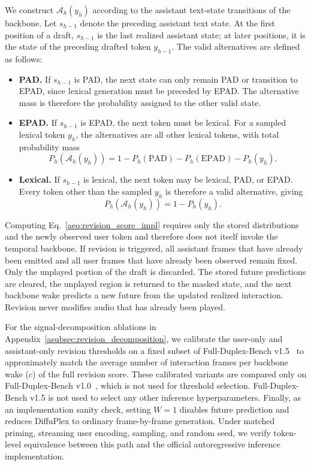 We construct $\mathcal{A}_h(y_h)$ according to the assistant text-state transitions of the backbone.
Let $s_{h-1}$ denote the preceding assistant text state.
At the first position of a draft, $s_{h-1}$ is the last realized assistant state; at later positions, it is the state of the preceding drafted token $y_{h-1}$.
The valid alternatives are defined as follows:
\begin{itemize}
    \item \textbf{PAD.}
    If $s_{h-1}$ is PAD, the next state can only remain PAD or transition to EPAD, since lexical generation must be preceded by EPAD.
    The alternative mass is therefore the probability assigned to the other valid state.

    \item \textbf{EPAD.}
    If $s_{h-1}$ is EPAD, the next token must be lexical.
    For a sampled lexical token $y_h$, the alternatives are all other lexical tokens, with total probability mass
    \begin{equation}
    P_h(\mathcal{A}_h(y_h))
    =
    1-P_h(\mathrm{PAD})-P_h(\mathrm{EPAD})-P_h(y_h).
    \end{equation}

    \item \textbf{Lexical.}
    If $s_{h-1}$ is lexical, the next token may be lexical, PAD, or EPAD.
    Every token other than the sampled $y_h$ is therefore a valid alternative, giving
    \begin{equation}
    P_h(\mathcal{A}_h(y_h))
    =
    1-P_h(y_h).
    \end{equation}
\end{itemize}

Computing Eq.~\ref{aeq:revision_score_impl} requires only the stored distributions and the newly observed user token and therefore does not itself invoke the temporal backbone.
If revision is triggered, all assistant frames that have already been emitted and all user frames that have already been observed remain fixed.
Only the unplayed portion of the draft is discarded.
The stored future predictions are cleared, the unplayed region is returned to the masked state, and the next backbone wake predicts a new future from the updated realized interaction.
Revision never modifies audio that has already been played.

For the signal-decomposition ablations in Appendix~\ref{asubsec:revision_decomposition}, we calibrate the user-only and assistant-only revision thresholds on a fixed subset of Full-Duplex-Bench v1.5~\citep{11463576} to approximately match the average number of interaction frames per backbone wake ($c$) of the full revision score.
These calibrated variants are compared only on Full-Duplex-Bench v1.0~\citep{11433838}, which is not used for threshold selection.
Full-Duplex-Bench v1.5 is not used to select any other inference hyperparameters.
Finally, as an implementation sanity check, setting $W=1$ disables future prediction and reduces DiffuPlex to ordinary frame-by-frame generation.
Under matched priming, streaming user encoding, sampling, and random seed, we verify token-level equivalence between this path and the official autoregressive inference implementation.

